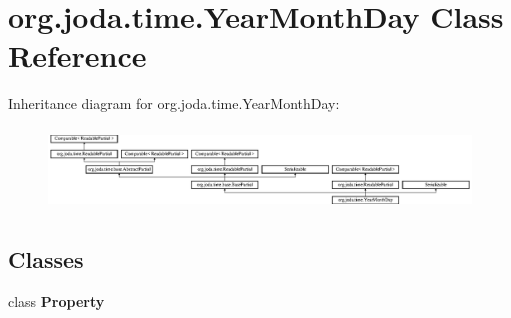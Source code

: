 \hypertarget{classorg_1_1joda_1_1time_1_1_year_month_day}{\section{org.\-joda.\-time.\-Year\-Month\-Day Class Reference}
\label{classorg_1_1joda_1_1time_1_1_year_month_day}
}
Inheritance diagram for org.\-joda.\-time.\-Year\-Month\-Day\-:\begin{figure}[H]
\begin{center}
\leavevmode
\includegraphics[height=2.211690cm]{classorg_1_1joda_1_1time_1_1_year_month_day}
\end{center}
\end{figure}
\subsection*{Classes}
\begin{DoxyCompactItemize}
\item 
class {\bfseries Property}
\end{DoxyCompactItemize}
